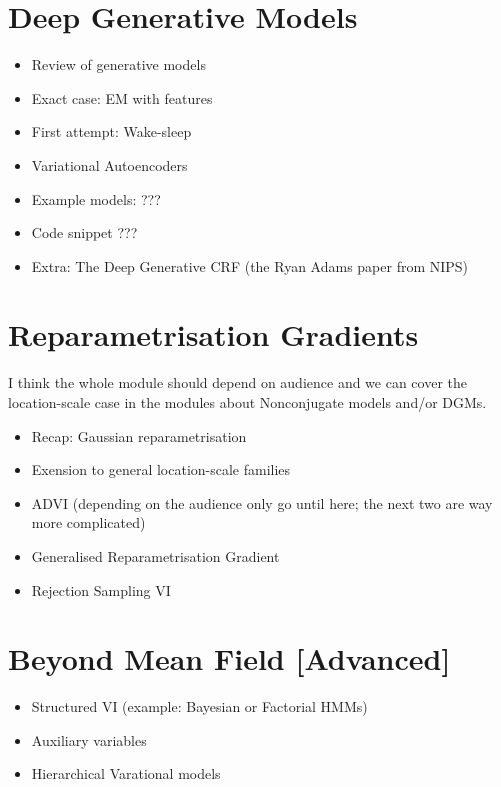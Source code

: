 \documentclass[11pt, a4paper]{article}
\begin{document}
\section{Deep Generative Models}
\begin{itemize}
\item Review of generative models
\item Exact case: EM with features \citep{BergkirkpatrickEtAl:2010}
\item First attempt: Wake-sleep \citep{HintonEtAl:1995}
\item Variational Autoencoders \citep{KingmaWelling:2013, RezendeEtAl:2014}
\item Example models: ???
\item Code snippet ??? 
\item Extra: The Deep Generative CRF (the Ryan Adams paper from NIPS)
\end{itemize}

\section{Reparametrisation Gradients}

I think the whole module should depend on audience and we can cover the location-scale case in the modules about Nonconjugate models and/or DGMs.

\begin{itemize}
\item Recap: Gaussian reparametrisation 
\item Exension to general location-scale families \citep{TitsiasLazarogredilla:2014}
\item ADVI (depending on the audience only go until here; the next two are way more complicated) \citep{KucukelbirEtAl:2017}
\item Generalised Reparametrisation Gradient \citep{RuizEtAl:2016}
\item Rejection Sampling VI \citep{NaessethEtAl:2017}
\end{itemize}

\section{Beyond Mean Field [Advanced]}
\begin{itemize}
\item Structured VI (example: Bayesian or Factorial HMMs)
\item Auxiliary variables
\item Hierarchical Varational models 
\end{itemize}
\end{document}
